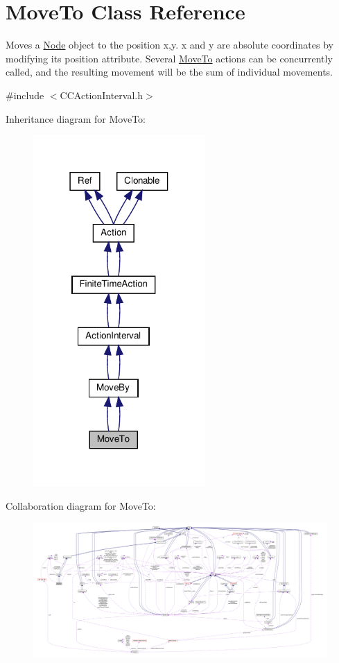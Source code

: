 \hypertarget{classMoveTo}{}\section{Move\+To Class Reference}
\label{classMoveTo}


Moves a \hyperlink{classNode}{Node} object to the position x,y. x and y are absolute coordinates by modifying it\textquotesingle{}s position attribute. Several \hyperlink{classMoveTo}{Move\+To} actions can be concurrently called, and the resulting movement will be the sum of individual movements.  




{\ttfamily \#include $<$C\+C\+Action\+Interval.\+h$>$}



Inheritance diagram for Move\+To\+:
\nopagebreak
\begin{figure}[H]
\begin{center}
\leavevmode
\includegraphics[width=186pt]{classMoveTo__inherit__graph}
\end{center}
\end{figure}


Collaboration diagram for Move\+To\+:
\nopagebreak
\begin{figure}[H]
\begin{center}
\leavevmode
\includegraphics[width=350pt]{classMoveTo__coll__graph}
\end{center}
\end{figure}
